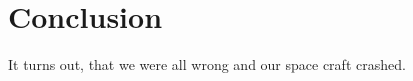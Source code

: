 

\section{Conclusion}

It turns out, that we were all wrong and our space craft crashed.

\pagebreak
